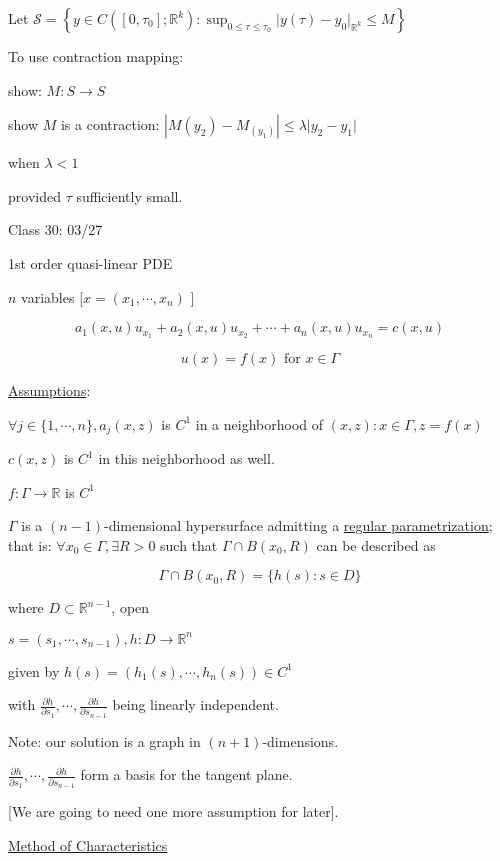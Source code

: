 \documentclass{article}
\theoremstyle{definition}
\begin{document}
Let \(\mathcal{S}=\left\{ y \in C([0,\tau_0];\mathbb{R}^k): \sup_{0 \leq \tau \leq \tau_0} \vert y(\tau) - y_0 \vert_{\mathbb{R}^k} \leq M \right\} \) 

To use contraction mapping:

show: \(M:S\to S\)

show \(M\) is a contraction: \(|M(y_2)-M_(y_1)| \leq \lambda \vert y_2 - y_1 \vert \) 

when \(\lambda < 1\)

provided \(\tau\) sufficiently small.

\hrulefill

Class 30: 03/27

1st order quasi-linear PDE

\(n\) variables [\(x = (x_1,\cdots,x_n)\) ]

\[
    a_1(x,u)u_{x_1} + a_2(x,u)u_{x_2} + \cdots + a_n(x,u)u_{x_n} = c(x,u)
\]

\[
    u(x) = f(x) \text{ for } x\in \Gamma
\]

\underline{Assumptions}:

\(\forall j\in \{ 1,\cdots,n \}, a_j(x,z)\) is \(C^1\) in a neighborhood of \((x,z):x\in \Gamma, z=f(x)\)

\(c(x,z)\) is \(C^1\) in this neighborhood as well.

\(f: \Gamma \to \mathbb{R}\) is \(C^1\) 

\(\Gamma\) is a \((n-1)\)-dimensional hypersurface admitting a \underline{regular parametrization}; that is: \(\forall x_0\in \Gamma, \exists R > 0\) such that \(\Gamma \cap B(x_0,R)\) can be described as

\[
    \Gamma \cap B(x_0,R) = \{ h(s):s\in D \} 
\]

where \(D \subset \mathbb{R}^{n-1}\), open

\(s = (s_1,\cdots,s_{n-1}), h:D\to\mathbb{R}^n\)

given by \(h(s)=(h_1(s),\cdots,h_n(s))\in C^1\) 

with \(\frac{\partial h}{\partial s_1}, \cdots, \frac{\partial h}{\partial s_{n-1}}\) being linearly independent.

Note: our solution is a graph in \((n+1)\)-dimensions.

\(\frac{\partial h}{\partial s_1},\cdots,\frac{\partial h}{\partial s_{n-1}}\) form a basis for the tangent plane.

[We are going to need one more assumption for later].

\underline{Method of Characteristics}
\end{document}
